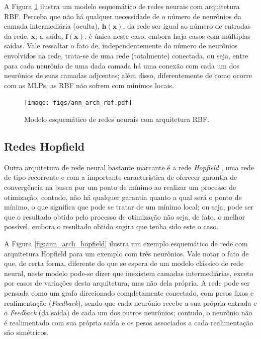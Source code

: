 A Figura \ref{fig:ann_arch_rbf} ilustra um modelo esquemático de redes neurais com arquitetura RBF. Perceba que não há qualquer necessidade de o número de neurônios da camada intermediária (oculta), $\bm{h(x)}$, da rede ser igual ao número de entradas da rede, $\bm{x}$; a saída, $\bm{f(x)}$, é única neste caso, embora haja casos com múltiplas saídas. Vale ressaltar o fato de, independentemente do número de neurônios envolvidos na rede, trata-se de uma rede (totalmente) conectada, ou seja, entre para cada neurônio de uma dada camada há uma conexão com cada um dos neurônios de suas camadas adjcentes; além disso, diferentemente de como ocorre com as MLPs, as RBF não sofrem com mínimos locais.

\begin{figure}[H]
    \centering
    \texttt{[image: figs/ann\_arch\_rbf.pdf]}
    \caption{Modelo esquemático de redes neurais com arquitetura RBF.}
    \label{fig:ann_arch_rbf}
\end{figure}








\subsection{Redes Hopfield}
\label{subsec:ann_hopfield_nets}

Outra arquitetura de rede neural bastante marcante é a rede \textit{Hopfield} \citep{hopfield1982neural}, uma rede de tipo recorrente e com a importante característica de oferecer garantia de convergência na busca por um ponto de mínimo ao realizar um processo de otimização, contudo, não há qualquer garantia quanto a qual será o ponto de mínimo, o que significa que pode se tratar de um mínimo local; ou seja, pode ser que o resultado obtido pelo processo de otimização não seja, de fato, o melhor possível, embora o resultado obtido sugira que tenha sido este o caso.

A Figura \ref{fig:ann_arch_hopfield} ilustra um exemplo esquemático de rede com arquitetura Hopfield para um exemplo com três neurônios. Vale notar o fato de que, de certa forma, diferente do que se espera de um modelo clássico de rede neural, neste modelo pode-se dizer que inexistem camadas intermediárias, exceto por casos de variações desta arquitetura, mas não dela própria. A rede pode ser pensada como um grafo direcionado completamente conectado, com pesos fixos e realimentação (\textit{Feedback}), sendo que cada neurônio recebe a sua própria entrada e o \textit{Feedback} (da saída) de cada um dos outros neurônios; contudo, o neurônio não é realimentado com sua própria saída e os pesos associados a cada realimentação são simétricos.

